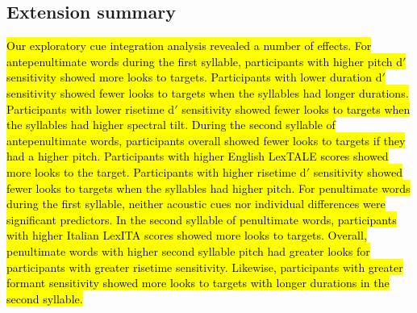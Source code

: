 \subsection{Extension summary}

\hl{Our exploratory cue integration analysis revealed a number of effects. For antepenultimate words during the first syllable, participants with higher pitch d$'$ sensitivity showed more looks to targets. Participants with lower duration d$'$ sensitivity showed fewer looks to targets when the syllables had longer durations. Participants with lower risetime d$'$ sensitivity showed fewer looks to targets when the syllables had higher spectral tilt. During the second syllable of antepenultimate words, participants overall showed fewer looks to targets if they had a higher pitch. Participants with higher English LexTALE scores showed more looks to the target. Participants with higher risetime d$'$ sensitivity showed fewer looks to targets when the syllables had higher pitch. For penultimate words during the first syllable, neither acoustic cues nor individual differences were significant predictors. In the second syllable of penultimate words, participants with higher Italian LexITA scores showed more looks to targets. Overall, penultimate words with higher second syllable pitch had greater looks for participants with greater risetime sensitivity. Likewise, participants with greater formant sensitivity showed more looks to targets with longer durations in the second syllable. 
}
